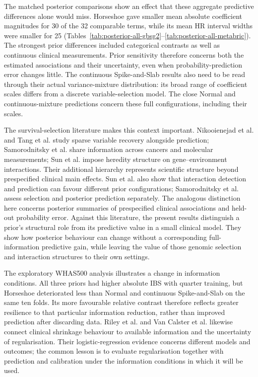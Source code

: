 The matched posterior comparisons show an effect that these aggregate predictive differences alone would miss. Horseshoe gave smaller mean absolute coefficient magnitudes for 30 of the 32 comparable terms, while its mean HR interval widths were smaller for 25 (Tables~\ref{tab:posterior-all-gbsg2}--\ref{tab:posterior-all-metabric}). The strongest prior differences included categorical contrasts as well as continuous clinical measurements. Prior sensitivity therefore concerns both the estimated associations and their uncertainty, even when probability-prediction error changes little. The continuous Spike-and-Slab results also need to be read through their actual variance-mixture distribution: its broad range of coefficient scales differs from a discrete variable-selection model. The close Normal and continuous-mixture predictions concern these full configurations, including their scales.

The survival-selection literature makes this context important. Nikooienejad et al. \cite{ref6} and Tang et al. \cite{ref25} study sparse variable recovery alongside prediction; Samorodnitsky et al. \cite{ref42} share information across cancers and molecular measurements; Sun et al. \cite{ref52} impose heredity structure on gene--environment interactions. Their additional hierarchy represents scientific structure beyond prespecified clinical main effects. Sun et al. also show that interaction detection and prediction can favour different prior configurations; Samorodnitsky et al. assess selection and posterior prediction separately. The analogous distinction here concerns posterior summaries of prespecified clinical associations and held-out probability error. Against this literature, the present results distinguish a prior's structural role from its predictive value in a small clinical model. They show how posterior behaviour can change without a corresponding full-information predictive gain, while leaving the value of those genomic selection and interaction structures to their own settings.

The exploratory WHAS500 analysis illustrates a change in information conditions. All three priors had higher absolute IBS with quarter training, but Horseshoe deteriorated less than Normal and continuous Spike-and-Slab on the same ten folds. Its more favourable relative contrast therefore reflects greater resilience to that particular information reduction, rather than improved prediction after discarding data. Riley et al. \cite{riley2021shrinkage} and Van Calster et al. \cite{vancalster2020shrinkage} likewise connect clinical shrinkage behaviour to available information and the uncertainty of regularisation. Their logistic-regression evidence concerns different models and outcomes; the common lesson is to evaluate regularisation together with prediction and calibration under the information conditions in which it will be used.

